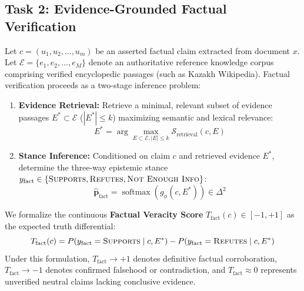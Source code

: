 \subsection{Task 2: Evidence-Grounded Factual Verification}
Let $c = (u_1, u_2, \dots, u_m)$ be an asserted factual claim extracted from document $x$. Let $\mathcal{E} = \{e_1, e_2, \dots, e_M\}$ denote an authoritative reference knowledge corpus comprising verified encyclopedic passages (such as Kazakh Wikipedia). Factual verification proceeds as a two-stage inference problem:
\begin{enumerate}
    \item \textbf{Evidence Retrieval:} Retrieve a minimal, relevant subset of evidence passages $E^* \subset \mathcal{E}$ ($|E^*| \le k$) maximizing semantic and lexical relevance:
    \begin{equation}
    E^* = \arg\max_{E \subset \mathcal{E}, |E| \le k} \mathcal{S}_{\text{retrieval}}(c, E)
    \end{equation}
    \item \textbf{Stance Inference:} Conditioned on claim $c$ and retrieved evidence $E^*$, determine the three-way epistemic stance $y_{\text{fact}} \in \{\textsc{Supports}, \textsc{Refutes}, \textsc{Not Enough Info}\}$:
    \begin{equation}
    \hat{\mathbf{p}}_{\text{fact}} = \operatorname{softmax}(g_\phi(c, E^*)) \in \Delta^2
    \end{equation}
\end{enumerate}
We formalize the continuous \textbf{Factual Veracity Score} $T_{\text{fact}}(c) \in [-1, +1]$ as the expected truth differential:
\begin{equation}
\label{eq:intro_t_fact_def}
T_{\text{fact}}(c) = P(y_{\text{fact}} = \textsc{Supports} \mid c, E^*) - P(y_{\text{fact}} = \textsc{Refutes} \mid c, E^*)
\end{equation}
Under this formulation, $T_{\text{fact}} \rightarrow +1$ denotes definitive factual corroboration, $T_{\text{fact}} \rightarrow -1$ denotes confirmed falsehood or contradiction, and $T_{\text{fact}} \approx 0$ represents unverified neutral claims lacking conclusive evidence.

